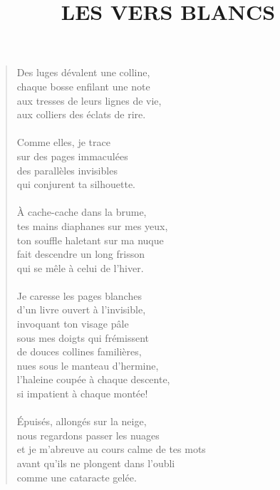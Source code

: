 \documentclass[twocolumn,11pt]{article}
\title{LES VERS BLANCS}
\author{}
\date{}
\begin{document}
\maketitle

\thispagestyle{empty}

\begin{verse}
  Des luges dévalent une colline, \\
  chaque bosse enfilant une note \\
  aux tresses de leurs lignes de vie, \\
  aux colliers des éclats de rire. \\
  \ \\
  Comme elles, je trace \\
  sur des pages immaculées \\
  des parallèles invisibles \\
  qui conjurent ta silhouette. \\
  \ \\
  À cache-cache dans la brume, \\
  tes mains diaphanes sur mes yeux, \\
  ton souffle haletant sur ma nuque \\
  fait descendre un long frisson \\
  qui se mêle à celui de l'hiver. \\
  \ \\
  Je caresse les pages blanches \\
  d'un livre ouvert à l'invisible, \\
  invoquant ton visage pâle \\
  sous mes doigts qui frémissent \\
  de douces collines familières, \\
  nues sous le manteau d'hermine, \\
  l'haleine coupée à chaque descente, \\
  si impatient à chaque montée! \\
  \ \\
  Épuisés, allongés sur la neige, \\
  nous regardons passer les nuages \\
  et je m'abreuve au cours calme de tes mots \\
  avant qu'ils ne plongent dans l'oubli \\
  comme une cataracte gelée.

  \newpage


\end{verse}
\end{document}
